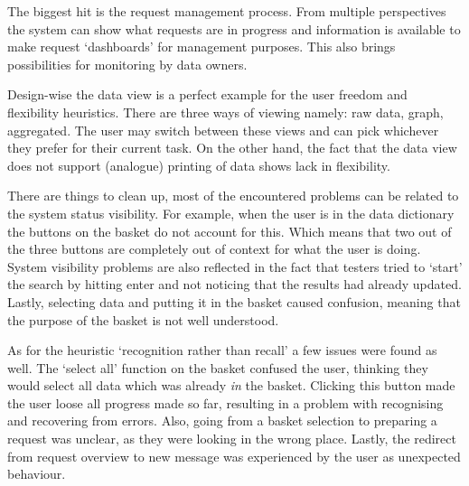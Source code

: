 The biggest hit is the request management process.
From multiple perspectives the system can show what requests are in progress and information is available to make request `dashboards' for management purposes.
This also brings possibilities for monitoring by data owners.

Design-wise the data view is a perfect example for the user freedom and flexibility heuristics.
There are three ways of viewing namely: raw data, graph, aggregated.
The user may switch between these views and can pick whichever they prefer for their current task.
On the other hand, the fact that the data view does not support (analogue) printing of data shows lack in flexibility.

There are things to clean up, most of the encountered problems can be related to the system status visibility.
For example, when the user is in the data dictionary the buttons on the basket do not account for this.
Which means that two out of the three buttons are completely out of context for what the user is doing.
System visibility problems are also reflected in the fact that testers tried to `start' the search by hitting enter and not noticing that the results had already updated.
Lastly, selecting data and putting it in the basket caused confusion, meaning that the purpose of the basket is not well understood.

As for the heuristic `recognition rather than recall' a few issues were found as well.
The `select all' function on the basket confused the user, thinking they would select all data which was already \emph{in} the basket.
Clicking this button made the user loose all progress made so far, resulting in a problem with recognising and recovering from errors.
Also, going from a basket selection to preparing a request was unclear, as they were looking in the wrong place.
Lastly, the redirect from request overview to new message was experienced by the user as unexpected behaviour.